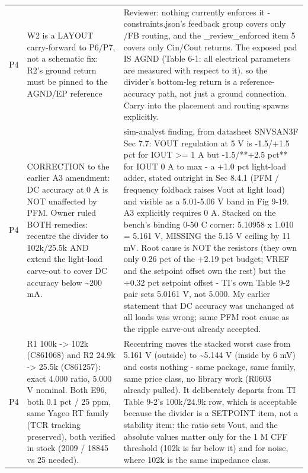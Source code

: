 \documentclass[11pt,a4paper]{article}
\begin{document}
{\begin{longtable}{lp{5.2cm}p{7.2cm}}
P4 & W2 is a LAYOUT carry-forward to P6/P7, not a schematic fix: R2's ground return must be pinned to the AGND/EP reference & Reviewer: nothing currently enforces it - constraints.json's feedback group covers only /FB routing, and the \_review\_enforced item 5 covers only Cin/Cout returns. The exposed pad IS AGND (Table 6-1: all electrical parameters are measured with respect to it), so the divider's bottom-leg return is a reference-accuracy path, not just a ground connection. Carry into the placement and routing spawns explicitly. \\
P4 & CORRECTION to the earlier A3 amendment: DC accuracy at 0 A is NOT unaffected by PFM. Owner ruled BOTH remedies: recentre the divider to 102k/25.5k AND extend the light-load carve-out to cover DC accuracy below \textasciitilde{}200 mA. & sim-analyst finding, from datasheet SNVSAN3F Sec 7.7: VOUT regulation at 5 V is -1.5/+1.5 pct for IOUT \textgreater{}= 1 A but -1.5/{*}{*}+2.5 pct{*}{*} for IOUT 0 A to max - a +1.0 pct light-load adder, stated outright in Sec 8.4.1 (PFM / frequency foldback raises Vout at light load) and visible as a 5.01-5.06 V band in Fig 9-19. A3 explicitly requires 0 A. Stacked on the bench's binding 0-50 C corner: 5.10958 x 1.010 = 5.161 V, MISSING the 5.15 V ceiling by 11 mV. Root cause is NOT the resistors (they own only 0.26 pct of the +2.19 pct budget; VREF and the setpoint offset own the rest) but the +0.32 pct setpoint offset - TI's own Table 9-2 pair sets 5.0161 V, not 5.000. My earlier statement that DC accuracy was unchanged at all loads was wrong; same PFM root cause as the ripple carve-out already accepted. \\
P4 & R1 100k -\textgreater{} 102k (C861068) and R2 24.9k -\textgreater{} 25.5k (C861257): exact 4.000 ratio, 5.000 V nominal. Both E96, both 0.1 pct / 25 ppm, same Yageo RT family (TCR tracking preserved), both verified in stock (2009 / 18845 vs 25 needed). & Recentring moves the stacked worst case from 5.161 V (outside) to \textasciitilde{}5.144 V (inside by 6 mV) and costs nothing - same package, same family, same price class, no library work (R0603 already pulled). It deliberately departs from TI Table 9-2's 100k/24.9k row, which is acceptable because the divider is a SETPOINT item, not a stability item: the ratio sets Vout, and the absolute values matter only for the 1 M CFF threshold (102k is far below it) and for noise, where 102k is the same impedance class. \\

\end{longtable}}
\end{document}
